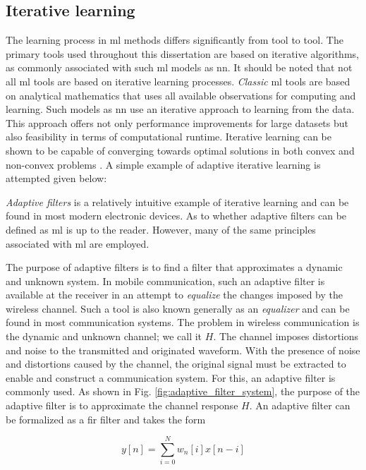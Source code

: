 \subsection{Iterative learning}
The learning process in \gls{ml} methods differs significantly from tool to tool. The primary tools used throughout this dissertation are based on iterative algorithms, as commonly associated with such \gls{ml} models as \gls{nn}. It should be noted that not all \gls{ml} tools are based on iterative learning processes. \emph{Classic} \gls{ml} tools are based on analytical mathematics that uses all available observations for computing and learning. Such models as \gls{nn} use an iterative approach to learning from the data. This approach offers not only performance improvements for large datasets but also feasibility in terms of computational runtime. Iterative learning can be shown to be capable of converging towards optimal solutions in both convex and non-convex problems \cite{M.Bishop2006}. A simple example of adaptive iterative learning is attempted given below:

\emph{Adaptive filters} is a relatively intuitive example of iterative learning and can be found in most modern electronic devices. As to whether adaptive filters can be defined as \gls{ml} is up to the reader. However, many of the same principles associated with \gls{ml} are employed. 

The purpose of adaptive filters is to find a filter that approximates a dynamic and unknown system. In mobile communication, such an adaptive filter is available at the receiver in an attempt to \emph{equalize} the changes imposed by the wireless channel. Such a tool is also known generally as an \emph{equalizer} and can be found in most communication systems. The problem in wireless communication is the dynamic and unknown channel; we call it $H$. The channel imposes distortions and noise to the transmitted and originated waveform. With the presence of noise and distortions caused by the channel, the original signal must be extracted to enable and construct a communication system. For this, an adaptive filter is commonly used.  As shown in Fig. \ref{fig:adaptive_filter_system}, the purpose of the adaptive filter is to approximate the channel response $H$. An adaptive filter can be formalized as a \gls{fir} filter and takes the form 

\begin{equation}\label{eq:fir}
    y[n] = \sum_{i=0}^N w_n[i]x[n-i]
\end{equation}

